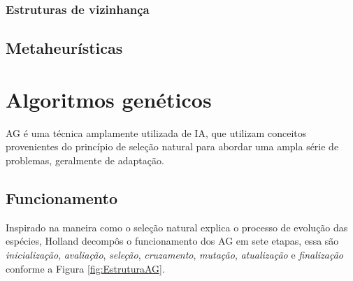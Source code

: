 \subsubsection{Estruturas de vizinhança}



\subsection{Metaheurísticas}

\section{Algoritmos genéticos}

AG é uma técnica amplamente utilizada de IA, que utilizam conceitos provenientes do princípio de seleção natural para abordar uma  ampla série de problemas, geralmente de adaptação. \cite{DiogoCLucas}

\subsection{Funcionamento}
 
Inspirado na maneira como o seleção natural explica o processo de evolução das espécies, Holland \cite{Holland1975} decompôs o funcionamento dos AG em sete etapas, essa são \textit{inicialização}, \textit{avaliação}, \textit{seleção}, \textit{cruzamento}, \textit{mutação}, \textit{atualização} e  \textit{finalização} conforme a Figura \ref{fig:EstruturaAG}. 

